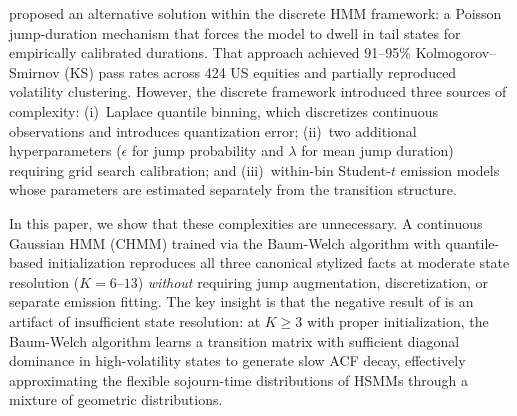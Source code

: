 \citet{alswaidan2026hybrid} proposed an alternative solution within the discrete HMM framework: a Poisson jump-duration mechanism that forces the model to dwell in tail states for empirically calibrated durations.
That approach achieved 91--95\% Kolmogorov--Smirnov (KS) pass rates across 424 US equities and partially reproduced volatility clustering.
However, the discrete framework introduced three sources of complexity: (i)~Laplace quantile binning, which discretizes continuous observations and introduces quantization error; (ii)~two additional hyperparameters ($\epsilon$ for jump probability and $\lambda$ for mean jump duration) requiring grid search calibration; and (iii)~within-bin Student-$t$ emission models whose parameters are estimated separately from the transition structure.

In this paper, we show that these complexities are unnecessary.
A continuous Gaussian HMM (CHMM) trained via the Baum-Welch algorithm \citep{baum1970maximization, rabiner1986introduction} with quantile-based initialization reproduces all three canonical stylized facts at moderate state resolution ($K = 6$--$13$) \emph{without} requiring jump augmentation, discretization, or separate emission fitting.
The key insight is that the negative result of \citet{ryden1998stylized} is an artifact of insufficient state resolution: at $K \geq 3$ with proper initialization, the Baum-Welch algorithm learns a transition matrix with sufficient diagonal dominance in high-volatility states to generate slow ACF decay, effectively approximating the flexible sojourn-time distributions of HSMMs through a mixture of geometric distributions.

